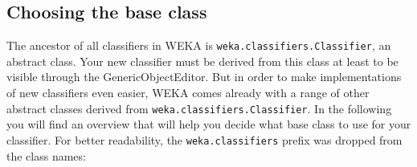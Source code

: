 %
%
%
%


\subsection{Choosing the base class}
The ancestor of all classifiers in WEKA is \texttt{weka.classifiers.Classifier},
an abstract class. Your new classifier must be derived from this class at
least to be visible through the GenericObjectEditor. But in order to
make implementations of new classifiers even easier, WEKA comes already with a
range of other abstract classes derived from
\texttt{weka.classifiers.Classifier}. In the following you will find an overview
that will help you decide what base class to use for your classifier. For better
readability, the \texttt{weka.classifiers} prefix was dropped from the class
names:
